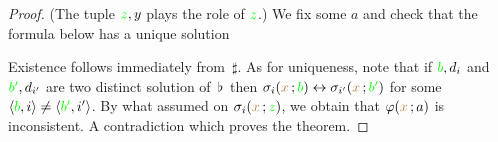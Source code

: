 \documentclass[creche.tex]{subfiles}
\begin{document}
\begin{proof}

(The tuple ${\color{green} z},y$ plays the role of ${\color{green} z}$.)  We fix some $a$ and check that the formula below has a unique solution


Existence follows immediately from $\,\sharp$.
As for uniqueness, note that if ${\color{green} b},d_i$ and ${\color{green} b'},d_{i'}$ are two distinct solution of $\,\flat\,$ then $\sigma_i({\color{brown} x}\,;{\color{green} b})\leftrightarrow\sigma_{i'}({\color{brown} x}\,;{\color{green} b'})$ for some $\langle{\color{green}b},i\rangle\neq\langle{\color{green}b'},i'\rangle$.
By what assumed on $\sigma_i({\color{brown} x}\,;{\color{green} z})$, we obtain that $\varphi({\color{brown} x}\,;a)$ is inconsistent.
A contradiction which proves the theorem.
\end{proof}
\end{document}
